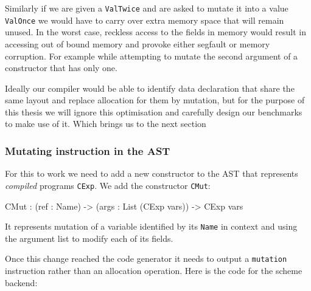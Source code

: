 \documentclass[
]{article}
\newenvironment{Shaded}{}{}
\newcommand{\DataTypeTok}[1]{\textcolor[rgb]{0.56,0.13,0.00}{#1}}
\newcommand{\NormalTok}[1]{#1}
\newcommand{\OperatorTok}[1]{\textcolor[rgb]{0.40,0.40,0.40}{#1}}
\newcommand{\OtherTok}[1]{\textcolor[rgb]{0.00,0.44,0.13}{#1}}
\begin{document}
Similarly if we are given a \texttt{ValTwice} and are asked to mutate it
into a value \texttt{ValOnce} we would have to carry over extra memory
space that will remain unused. In the worst case, reckless access to the
fields in memory would result in accessing out of bound memory and
provoke either segfault or memory corruption. For example while
attempting to mutate the second argument of a constructor that has only
one.

Ideally our compiler would be able to identify data declaration that
share the same layout and replace allocation for them by mutation, but
for the purpose of this thesis we will ignore this optimisation and
carefully design our benchmarks to make use of it. Which brings us to
the next section

\hypertarget{mutating-instruction-in-the-ast}{%
\subsubsection{Mutating instruction in the
AST}\label{mutating-instruction-in-the-ast}}

For this to work we need to add a new constructor to the AST that
represents \emph{compiled} programs \texttt{CExp}. We add the
constructor \texttt{CMut}:

\begin{Shaded}
\begin{Highlighting}[]
\DataTypeTok{CMut} \OperatorTok{:}\NormalTok{ (ref }\OperatorTok{:} \DataTypeTok{Name}\NormalTok{) }\OtherTok{{-}\textgreater{}}\NormalTok{ (args }\OperatorTok{:} \DataTypeTok{List}\NormalTok{ (}\DataTypeTok{CExp}\NormalTok{ vars)) }\OtherTok{{-}\textgreater{}} \DataTypeTok{CExp}\NormalTok{ vars }
\end{Highlighting}
\end{Shaded}

It represents mutation of a variable identified by its \texttt{Name} in
context and using the argument list to modify each of its fields.

Once this change reached the code generator it needs to output a
\texttt{mutation} instruction rather than an allocation operation. Here
is the code for the scheme backend:
\end{document}
